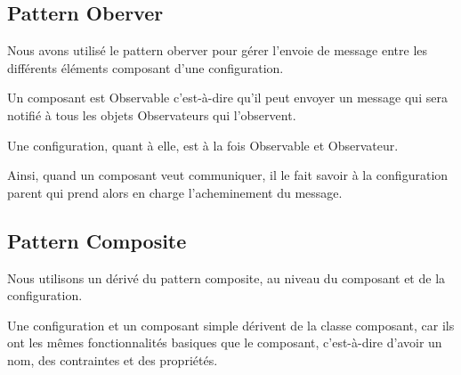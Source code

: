 \subsection{Pattern Oberver}
Nous avons utilisé le pattern oberver pour gérer l'envoie de message entre les
différents éléments composant d'une configuration.

Un composant est Observable c'est-à-dire qu'il peut envoyer un message qui sera
notifié à tous les objets Observateurs qui l'observent.

Une configuration, quant à elle, est à la fois Observable et Observateur.

Ainsi, quand un composant veut communiquer, il le fait savoir à la configuration
parent qui prend alors en charge l'acheminement du message.

\subsection{Pattern Composite}
Nous utilisons un dérivé du pattern composite, au niveau du composant et de la
configuration.

Une configuration et un composant simple dérivent de la classe composant, car
ils ont les mêmes fonctionnalités basiques que le composant, c'est-à-dire
d'avoir un nom, des contraintes et des propriétés.

\clearpage
